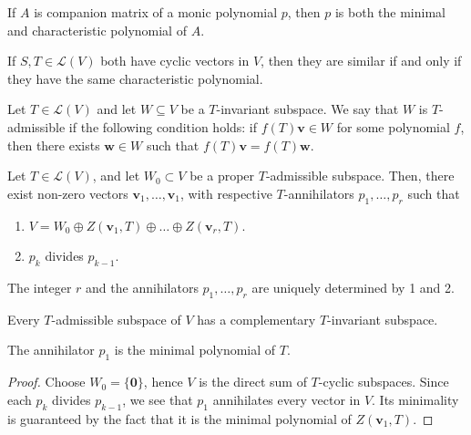\documentclass[11pt]{article}
\renewcommand{\vec}[1]{\boldsymbol{#1}}
\newcommand{\vv}{\vec{v}}
\newcommand{\vw}{\vec{w}}
\newcommand{\alg}[1]{\mathscr{#1}}
\newcommand{\algL}{\alg{L}}
\theoremstyle{definition}
\theoremstyle{remark}
\numberwithin{equation}{section}
\begin{document}
    \begin{corollary}
        If $A$ is companion matrix of a monic polynomial $p$, then $p$ is both the
        minimal and characteristic polynomial of $A$.
    \end{corollary}

    \begin{corollary}
        If $S, T \in \algL(V)$ both have cyclic vectors in $V$, then they are similar
        if and only if they have the same characteristic polynomial.
    \end{corollary}

    \begin{definition}
        Let $T \in \algL(V)$ and let $W \subseteq V$ be a $T$-invariant subspace. We
        say that $W$ is $T$-admissible if the following condition holds: if $f(T) \vv
        \in W$ for some polynomial $f$, then there exists $\vw \in W$ such that
        $f(T)\vv = f(T)\vw$.
    \end{definition}

    \begin{theorem}
        Let $T \in \algL(V)$, and let $W_0 \subset V$ be a proper $T$-admissible
        subspace. Then, there exist non-zero vectors $\vv_1, \dots, \vv_1$, with
        respective $T$-annihilators $p_1, \dots, p_r$ such that \begin{enumerate}
            \itemsep0em
            \item $V = W_0 \oplus Z(\vv_1, T) \oplus \dots \oplus Z(\vv_r, T)$.
            \item $p_k$ divides $p_{k - 1}$.
        \end{enumerate}
        The integer $r$ and the annihilators $p_1, \dots, p_r$ are uniquely
        determined by 1 and 2.
    \end{theorem}

    \begin{corollary}
        Every $T$-admissible subspace of $V$ has a complementary $T$-invariant
        subspace.
    \end{corollary}

    \begin{corollary}
        The annihilator $p_1$ is the minimal polynomial of $T$.
    \end{corollary}
    \begin{proof}
        Choose $W_0 = \{\vec{0}\}$, hence $V$ is the direct sum of $T$-cyclic
        subspaces. Since each $p_k$ divides $p_{k - 1}$, we see that $p_1$
        annihilates every vector in $V$. Its minimality is guaranteed by the fact
        that it is the minimal polynomial of $Z(\vv_1, T)$.
    \end{proof}
\end{document}
